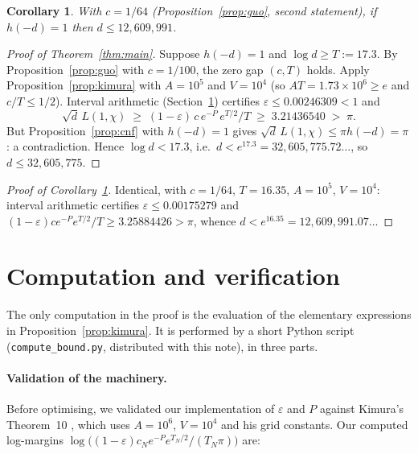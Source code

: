 \documentclass[11pt]{article}
\newtheorem{corollary}{Corollary}
\begin{document}
\begin{corollary}
\label{cor:variant}
With $c = 1/64$ \textup{(}Proposition~\ref{prop:guo}, second
statement\textup{)}, if $h(-d) = 1$ then $d \le 12{,}609{,}991$.
\end{corollary}

\begin{proof}[Proof of Theorem~\ref{thm:main}]
Suppose $h(-d) = 1$ and $\log d \ge T := 17.3$. By
Proposition~\ref{prop:guo} with $c = 1/100$, the zero gap $(c, T)$ holds.
Apply Proposition~\ref{prop:kimura} with $A = 10^5$ and $V = 10^4$ (so
$AT = 1.73\times 10^6 \ge e$ and $c/T \le 1/2$). Interval arithmetic
(Section~\ref{sec:verify}) certifies
$\varepsilon \le 0.00246309 < 1$ and
\[
\sqrt{d}\, L(1,\chi) \;\ge\; (1-\varepsilon)\, c\, e^{-P}\, e^{T/2}/T
\;\ge\; 3.21436540 \;>\; \pi.
\]
But Proposition~\ref{prop:cnf} with $h(-d) = 1$ gives
$\sqrt{d}\, L(1,\chi) \le \pi h(-d) = \pi$: a contradiction. Hence
$\log d < 17.3$, i.e.\ $d < e^{17.3} = 32{,}605{,}775.72\ldots$, so
$d \le 32{,}605{,}775$.
\end{proof}

\begin{proof}[Proof of Corollary~\ref{cor:variant}]
Identical, with $c = 1/64$, $T = 16.35$, $A = 10^5$, $V = 10^4$:
interval arithmetic certifies $\varepsilon \le 0.00175279$ and
$(1-\varepsilon) c e^{-P} e^{T/2}/T \ge 3.25884426 > \pi$, whence
$d < e^{16.35} = 12{,}609{,}991.07\ldots$
\end{proof}

\section{Computation and verification}
\label{sec:verify}

The only computation in the proof is the evaluation of the elementary
expressions in Proposition~\ref{prop:kimura}. It is performed by a short
Python script (\texttt{compute\_bound.py}, distributed with this note),
in three parts.

\paragraph{Validation of the machinery.}
Before optimising, we validated our implementation of $\varepsilon$ and
$P$ against Kimura's Theorem~10 \cite{kimura}, which uses
$A = 10^6$, $V = 10^4$ and his grid constants. Our computed log-margins
$\log\bigl((1-\varepsilon)c_N e^{-P} e^{T_N/2}/(T_N \pi)\bigr)$ are:
\end{document}
